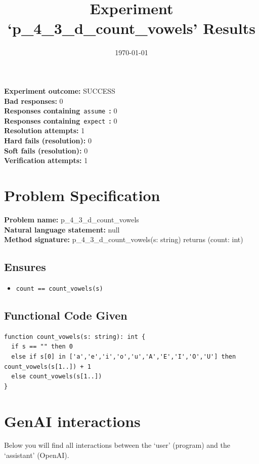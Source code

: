 \documentclass{article}
\begin{document}
\title{Experiment `p\_4\_3\_d\_count\_vowels' Results}
\author{\today}
\date{}
\maketitle
\textbf{Experiment outcome: }SUCCESS
\\\textbf{Bad responses: }0
\\\textbf{Responses containing}~\texttt{assume}~\textbf{: }0
\\\textbf{Responses containing}~\texttt{expect}~\textbf{: }0
\\\textbf{Resolution attempts: }1
\\\textbf{Hard fails (resolution): }0
\\\textbf{Soft fails (resolution): }0
\\\textbf{Verification attempts: }1
\section*{Problem Specification}
\textbf{Problem name: }p\_4\_3\_d\_count\_vowels
\\\textbf{Natural language statement: }null
\\\textbf{Method signature: }p\_4\_3\_d\_count\_vowels(s: string) returns (count: int)
\subsection*{Ensures}
\begin{itemize}
\item \texttt{count == count\_vowels(s) }
\end{itemize}
\subsection*{Functional Code Given}
\begin{lstlisting}
function count_vowels(s: string): int {
  if s == "" then 0
  else if s[0] in ['a','e','i','o','u','A','E','I','O','U'] then count_vowels(s[1..]) + 1
  else count_vowels(s[1..])
}
\end{lstlisting}
\clearpage
\section*{GenAI interactions}
Below you will find all interactions between the `user' (program) and the `assistant' (OpenAI).
\end{document}
